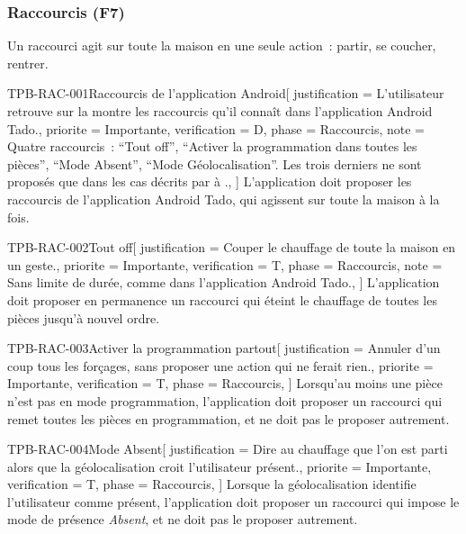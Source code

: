 \subsubsection{Raccourcis (F7)}
\label{sec:raccourcis}

Un raccourci agit sur toute la maison en une seule action~: partir, se coucher, rentrer.

\begin{exigence}{TPB-RAC-001}{Raccourcis de l'application Android}[
    justification = {L'utilisateur retrouve sur la montre les raccourcis qu'il connaît dans
                     l'application Android Tado.},
    priorite      = {Importante},
    verification  = {D},
    phase         = {Raccourcis},
    note          = {Quatre raccourcis~: \enquote{Tout off}, \enquote{Activer la
                     programmation dans toutes les pièces}, \enquote{Mode Absent},
                     \enquote{Mode Géolocalisation}. Les trois derniers ne sont proposés que
                     dans les cas décrits par  à
                     .},
  ]
  L'application doit proposer les raccourcis de l'application Android Tado, qui agissent sur
  toute la maison à la fois.
\end{exigence}

\begin{exigence}{TPB-RAC-002}{Tout off}[
    justification = {Couper le chauffage de toute la maison en un geste.},
    priorite      = {Importante},
    verification  = {T},
    phase         = {Raccourcis},
    note          = {Sans limite de durée, comme dans l'application Android Tado.},
  ]
  L'application doit proposer en permanence un raccourci qui éteint le chauffage de toutes
  les pièces jusqu'à nouvel ordre.
\end{exigence}

\begin{exigence}{TPB-RAC-003}{Activer la programmation partout}[
    justification = {Annuler d'un coup tous les forçages, sans proposer une action qui ne
                     ferait rien.},
    priorite      = {Importante},
    verification  = {T},
    phase         = {Raccourcis},
  ]
  Lorsqu'au moins une pièce n'est pas en mode programmation, l'application doit proposer un
  raccourci qui remet toutes les pièces en programmation, et ne doit pas le proposer
  autrement.
\end{exigence}

\begin{exigence}{TPB-RAC-004}{Mode Absent}[
    justification = {Dire au chauffage que l'on est parti alors que la géolocalisation
                     croit l'utilisateur présent.},
    priorite      = {Importante},
    verification  = {T},
    phase         = {Raccourcis},
  ]
  Lorsque la géolocalisation identifie l'utilisateur comme présent, l'application doit
  proposer un raccourci qui impose le mode de présence \emph{Absent}, et ne doit pas le
  proposer autrement.
\end{exigence}

